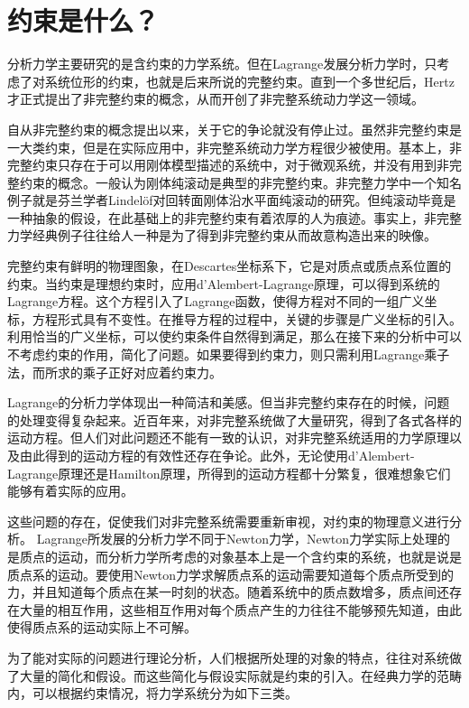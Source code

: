 \documentclass{ctexart}
\begin{document}
\section{约束是什么？}
\label{sec:constraint}


分析力学主要研究的是含约束的力学系统。但在Lagrange发展分析力学时，只考虑了对系统位形的约束，也就是后来所说的完整约束。直到一个多世纪后，Hertz才正式提出了非完整约束的概念，从而开创了非完整系统动力学这一领域。

自从非完整约束的概念提出以来，关于它的争论就没有停止过。虽然非完整约束是一大类约束，但是在实际应用中，非完整系统动力学方程很少被使用。基本上，非完整约束只存在于可以用刚体模型描述的系统中，对于微观系统，并没有用到非完整约束的概念。一般认为刚体纯滚动是典型的非完整约束。非完整力学中一个知名例子就是芬兰学者Lindel\"of对回转面刚体沿水平面纯滚动的研究。但纯滚动毕竟是一种抽象的假设，在此基础上的非完整约束有着浓厚的人为痕迹。事实上，非完整力学经典例子往往给人一种是为了得到非完整约束从而故意构造出来的映像。


完整约束有鲜明的物理图象，在Descartes坐标系下，它是对质点或质点系位置的约束。当约束是理想约束时，应用d'Alembert-Lagrange原理，可以得到系统的Lagrange方程。这个方程引入了Lagrange函数，使得方程对不同的一组广义坐标，方程形式具有不变性。在推导方程的过程中，关键的步骤是广义坐标的引入。利用恰当的广义坐标，可以使约束条件自然得到满足，那么在接下来的分析中可以不考虑约束的作用，简化了问题。如果要得到约束力，则只需利用Lagrange乘子法，而所求的乘子正好对应着约束力。

Lagrange的分析力学体现出一种简洁和美感。但当非完整约束存在的时候，问题的处理变得复杂起来。近百年来，对非完整系统做了大量研究，得到了各式各样的运动方程。但人们对此问题还不能有一致的认识，对非完整系统适用的力学原理以及由此得到的运动方程的有效性还存在争论。此外，无论使用d'Alembert-Lagrange原理还是Hamilton原理，所得到的运动方程都十分繁复，很难想象它们能够有着实际的应用。

这些问题的存在，促使我们对非完整系统需要重新审视，对约束的物理意义进行分析。
Lagrange所发展的分析力学不同于Newton力学，Newton力学实际上处理的是质点的运动，而分析力学所考虑的对象基本上是一个含约束的系统，也就是说是质点系的运动。要使用Newton力学求解质点系的运动需要知道每个质点所受到的力，并且知道每个质点在某一时刻的状态。随着系统中的质点数增多，质点间还存在大量的相互作用，这些相互作用对每个质点产生的力往往不能够预先知道，由此使得质点系的运动实际上不可解。

为了能对实际的问题进行理论分析，人们根据所处理的对象的特点，往往对系统做了大量的简化和假设。而这些简化与假设实际就是约束的引入。在经典力学的范畴内，可以根据约束情况，将力学系统分为如下三类。
\end{document}
